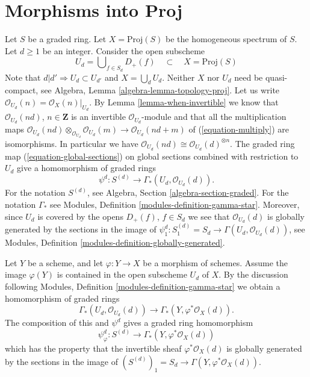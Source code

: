 \section{Morphisms into Proj}
\label{section-morphisms-proj}

\noindent
Let $S$ be a graded ring.
Let $X = \text{Proj}(S)$ be the homogeneous spectrum of $S$.
Let $d \geq 1$ be an integer.
Consider the open subscheme
\begin{equation}
\label{equation-Ud}
U_d = \bigcup\nolimits_{f  \in S_d} D_{+}(f)
\quad\subset\quad
X = \text{Proj}(S)
\end{equation}
Note that $d | d' \Rightarrow U_d \subset U_{d'}$ and
$X = \bigcup_d U_d$. Neither $X$ nor $U_d$ need
be quasi-compact, see Algebra, Lemma \ref{algebra-lemma-topology-proj}.
Let us write $\mathcal{O}_{U_d}(n) = \mathcal{O}_X(n)|_{U_d}$.
By Lemma \ref{lemma-when-invertible}
we know that $\mathcal{O}_{U_d}(nd)$, $n \in \mathbf{Z}$
is an invertible $\mathcal{O}_{U_d}$-module and
that all the multiplication maps
$\mathcal{O}_{U_d}(nd) \otimes_{\mathcal{O}_{U_d}} \mathcal{O}_{U_d}(m)
\to \mathcal{O}_{U_d}(nd + m)$ of
(\ref{equation-multiply}) are isomorphisms. In particular we have
$\mathcal{O}_{U_d}(nd) \cong \mathcal{O}_{U_d}(d)^{\otimes n}$.
The graded ring map (\ref{equation-global-sections}) on global sections
combined with restriction to $U_d$ give a homomorphism of graded rings
\begin{equation}
\label{equation-psi-d}
\psi^d : S^{(d)} \longrightarrow \Gamma_*(U_d, \mathcal{O}_{U_d}(d)).
\end{equation}
For the notation $S^{(d)}$, see Algebra, Section \ref{algebra-section-graded}.
For the notation $\Gamma_*$ see
Modules, Definition \ref{modules-definition-gamma-star}.
Moreover, since $U_d$ is covered by the opens $D_{+}(f)$, $f \in S_d$
we see that $\mathcal{O}_{U_d}(d)$ is globally generated
by the sections in the image of
$\psi^d_1 : S^{(d)}_1 = S_d \to \Gamma(U_d, \mathcal{O}_{U_d}(d))$, see
Modules, Definition \ref{modules-definition-globally-generated}.

\medskip\noindent
Let $Y$ be a scheme, and let $\varphi : Y \to X$ be a morphism of schemes.
Assume the image $\varphi(Y)$ is contained in the open subscheme
$U_d$ of $X$.
By the discussion following
Modules, Definition \ref{modules-definition-gamma-star}
we obtain a homomorphism of graded rings
$$
\Gamma_*(U_d, \mathcal{O}_{U_d}(d))
\longrightarrow
\Gamma_*(Y, \varphi^*\mathcal{O}_X(d)).
$$
The composition of this and $\psi^d$ gives a graded ring
homomorphism
\begin{equation}
\label{equation-psi-phi-d}
\psi_\varphi^d :
S^{(d)}
\longrightarrow
\Gamma_*(Y, \varphi^*\mathcal{O}_X(d))
\end{equation}
which has the property that the invertible sheaf
$\varphi^*\mathcal{O}_X(d)$ is globally generated
by the sections in the image of
$(S^{(d)})_1 = S_d \to \Gamma(Y, \varphi^*\mathcal{O}_X(d))$.

